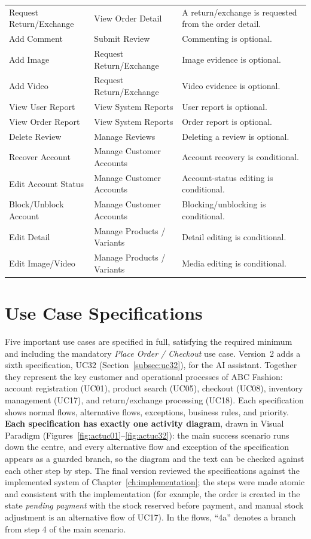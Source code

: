 \documentclass[11pt,a4paper,oneside]{extreport}
\newif\ifshowvtwo
\newcommand{\upd}[1]{\ifshowvtwo\textcolor{red}{#1}\else#1\fi}
\begin{document}
{\begin{xltabular}{\textwidth}{@{}L{3.6cm} L{3.6cm} Y@{}}
Request Return/Exchange & View Order Detail & A return/exchange is requested from the order detail. \\
Add Comment & Submit Review & Commenting is optional. \\
Add Image & Request Return/Exchange & Image evidence is optional. \\
Add Video & Request Return/Exchange & Video evidence is optional. \\
View User Report & View System Reports & User report is optional. \\
View Order Report & View System Reports & Order report is optional. \\
Delete Review & Manage Reviews & Deleting a review is optional. \\
Recover Account & Manage Customer Accounts & Account recovery is conditional. \\
Edit Account Status & Manage Customer Accounts & Account-status editing is conditional. \\
Block/Unblock Account & Manage Customer Accounts & Blocking/unblocking is conditional. \\
Edit Detail & Manage Products / Variants & Detail editing is conditional. \\
Edit Image/Video & Manage Products / Variants & Media editing is conditional. \\
\end{xltabular}
}

\section{Use Case Specifications}
\label{sec:ucspec}
Five important use cases are specified in full, satisfying the required minimum and including the mandatory \emph{Place Order / Checkout} use case. \upd{Version~2 adds a sixth specification, UC32 (Section~\ref{subsec:uc32}), for the AI assistant.} Together they represent the key customer and operational processes of ABC Fashion: account registration (UC01), product search (UC05), checkout (UC08), inventory management (UC17), and return/exchange processing (UC18). Each specification shows normal flows, alternative flows, exceptions, business rules, and priority. \textbf{Each specification has exactly one activity diagram}, drawn in Visual Paradigm (Figures~\ref{fig:actuc01}--\ref{fig:actuc32}): the main success scenario runs down the centre, and every alternative flow and exception of the specification appears as a guarded branch, so the diagram and the text can be checked against each other step by step. The final version reviewed the specifications against the implemented system of Chapter~\ref{ch:implementation}; the steps were made atomic and consistent with the implementation (for example, the order is created in the state \emph{pending payment} with the stock reserved before payment, and manual stock adjustment is an alternative flow of UC17). In the flows, ``4a'' denotes a branch from step 4 of the main scenario.
\end{document}
